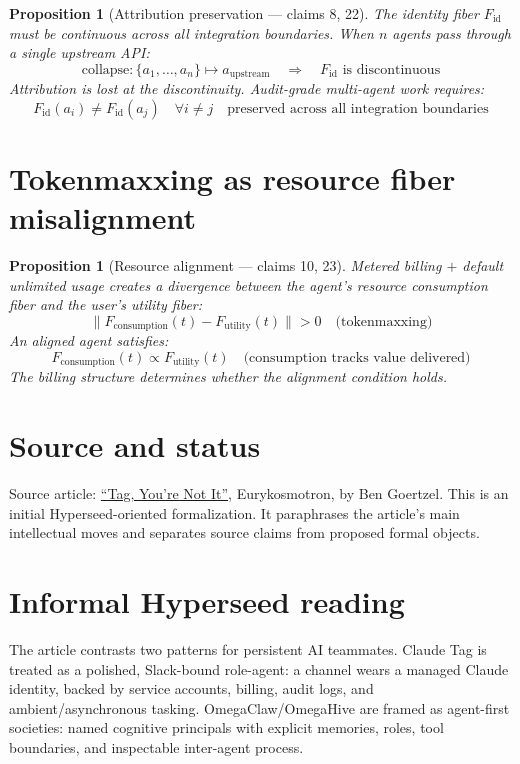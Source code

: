 \documentclass[11pt,a4paper]{article}
\newtheorem{proposition}[definition]{Proposition}
\begin{document}
\begin{proposition}[Attribution preservation --- claims 8, 22]
\label{prop:attribution}
The identity fiber $F_{\text{id}}$ must be continuous across all
integration boundaries. When $n$ agents pass through a single
upstream API:
\[
  \text{collapse}: \{a_1, \ldots, a_n\} \mapsto a_{\text{upstream}}
  \quad \Longrightarrow \quad F_{\text{id}} \text{ is discontinuous}
\]
Attribution is lost at the discontinuity. Audit-grade multi-agent work
requires:
\[
  F_{\text{id}}(a_i) \neq F_{\text{id}}(a_j) \quad \forall i \neq j
  \quad \text{preserved across all integration boundaries}
\]
\end{proposition}

\section{Tokenmaxxing as resource fiber misalignment}

\begin{proposition}[Resource alignment --- claims 10, 23]
\label{prop:tokenmaxxing}
Metered billing $+$ default unlimited usage creates a divergence
between the agent's resource consumption fiber and the user's utility
fiber:
\[
  \|F_{\text{consumption}}(t) - F_{\text{utility}}(t)\| > 0
  \quad \text{(tokenmaxxing)}
\]
An aligned agent satisfies:
\[
  F_{\text{consumption}}(t) \propto F_{\text{utility}}(t)
  \quad \text{(consumption tracks value delivered)}
\]
The billing structure determines whether the alignment condition holds.
\end{proposition}


\section{Source and status}
Source article: \href{https://bengoertzel.substack.com/p/tag-youre-not-it}{``Tag, You're Not It''}, Eurykosmotron, by Ben Goertzel.
This is an initial Hyperseed-oriented formalization. It paraphrases the article's main intellectual moves and separates source claims from proposed formal objects.

\section{Informal Hyperseed reading}
The article contrasts two patterns for persistent AI teammates. Claude Tag is treated as a polished, Slack-bound role-agent: a channel wears a managed Claude identity, backed by service accounts, billing, audit logs, and ambient/asynchronous tasking. OmegaClaw/OmegaHive are framed as agent-first societies: named cognitive principals with explicit memories, roles, tool boundaries, and inspectable inter-agent process.
\end{document}
